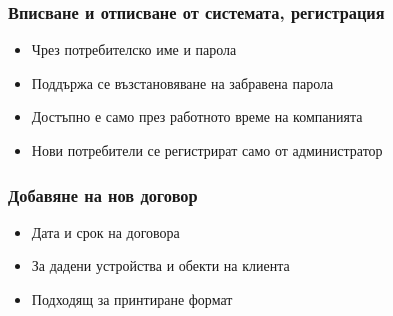 \begin{frame}
  \frametitle{Вписване и отписване от системата, регистрация}
    \begin{itemize}
      \item Чрез потребителско име и парола
      \item Поддържа се възстановяване на забравена парола
      \item Достъпно е само през работното време на компанията
      \item Нови потребители се регистрират само от администратор
    \end{itemize}
\end{frame}

\begin{frame}
  \frametitle{Добавяне на нов договор}
    \begin{itemize}
	\item Дата и срок на договора
	\item За дадени устройства и обекти на клиента
	\item Подходящ за принтиране формат
    \end{itemize}
\end{frame}
